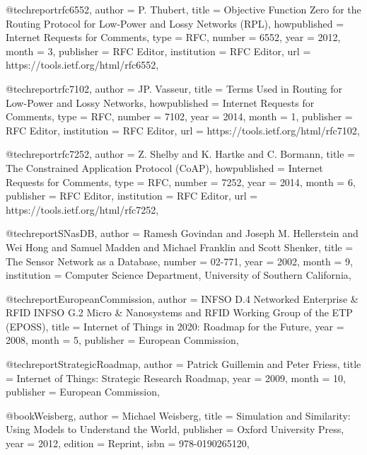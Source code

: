 \documentclass[english,version-2019-11]{uzl-thesis}
\begin{document}
\begin{bibtex-entries}
@techreport{rfc6552,
  author        = {P. Thubert},
  title         = {Objective Function Zero for the Routing Protocol for Low-Power and Lossy Networks (RPL)},
  howpublished  = {Internet Requests for Comments},
  type          = {RFC},
  number        = {6552},
  year          = {2012},
  month         = {3},
  publisher     = {RFC Editor},
  institution   = {RFC Editor},
  url           = {https://tools.ietf.org/html/rfc6552},
}

@techreport{rfc7102,
  author        = {JP. Vasseur},
  title         = {Terms Used in Routing for Low-Power and Lossy Networks},
  howpublished  = {Internet Requests for Comments},
  type          = {RFC},
  number        = {7102},
  year          = {2014},
  month         = {1},
  publisher     = {RFC Editor},
  institution   = {RFC Editor},
  url           = {https://tools.ietf.org/html/rfc7102},
}

@techreport{rfc7252,
  author        = {Z. Shelby and K. Hartke and C. Bormann},
  title         = {The Constrained Application Protocol (CoAP)},
  howpublished  = {Internet Requests for Comments},
  type          = {RFC},
  number        = {7252},
  year          = {2014},
  month         = {6},
  publisher     = {RFC Editor},
  institution   = {RFC Editor},
  url           = {https://tools.ietf.org/html/rfc7252},
}

@techreport{SNasDB,
  author        = {Ramesh Govindan and Joseph M. Hellerstein and Wei Hong and Samuel Madden and Michael Franklin and Scott Shenker},
  title         = {The Sensor Network as a Database},
  number        = {02-771},
  year          = {2002},
  month         = {9},
  institution   = {Computer Science Department, University of Southern California},
}

@techreport{EuropeanCommission,
  author        = {{INFSO D.4 Networked Enterprise \& RFID INFSO G.2 Micro \& Nanosystems} and {RFID Working Group of the ETP (EPOSS)}},
  title         = {Internet of Things in 2020: Roadmap for the Future},
  year          = {2008},
  month         = {5},
  publisher     = {European Commission},
}

@techreport{StrategicRoadmap,
  author        = {Patrick Guillemin and Peter Friess},
  title         = {Internet of Things: Strategic Research Roadmap},
  year          = {2009},
  month         = {10},
  publisher     = {European Commission},
}


@book{Weisberg,
    author    = {Michael Weisberg}, 
    title     = {Simulation and Similarity: Using Models to Understand the World},
    publisher = {Oxford University Press},
    year      = {2012},
    edition   = {Reprint},
    isbn      = {978-0190265120},
}


\end{bibtex-entries}
\end{document}
